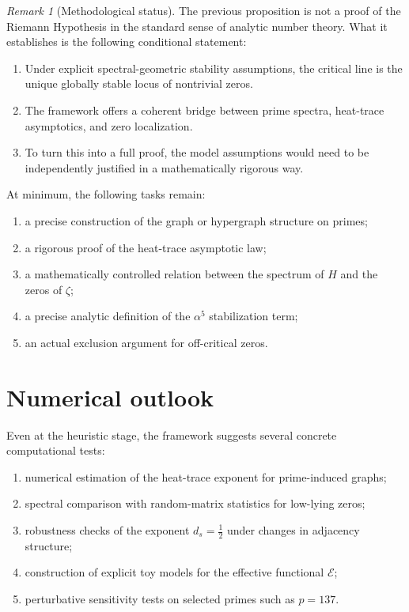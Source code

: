 \documentclass[11pt,a4paper]{amsart}
\theoremstyle{plain}
\theoremstyle{definition}
\theoremstyle{remark}
\newtheorem{remark}[theorem]{Remark}
\newcommand{\zetaR}{\zeta}
\newcommand{\Eeff}{\mathcal{E}}
\begin{document}
	\begin{remark}[Methodological status]
		The previous proposition is not a proof of the Riemann Hypothesis in the standard sense of analytic number theory. What it establishes is the following conditional statement:
		\begin{enumerate}[label=\arabic*.]
			\item Under explicit spectral-geometric stability assumptions, the critical line is the unique globally stable locus of nontrivial zeros.
			\item The framework offers a coherent bridge between prime spectra, heat-trace asymptotics, and zero localization.
			\item To turn this into a full proof, the model assumptions would need to be independently justified in a mathematically rigorous way.
		\end{enumerate}
	\end{remark}
	
	At minimum, the following tasks remain:
	\begin{enumerate}[label=\alph*)]
		\item a precise construction of the graph or hypergraph structure on primes;
		\item a rigorous proof of the heat-trace asymptotic law;
		\item a mathematically controlled relation between the spectrum of \(H\) and the zeros of \(\zetaR\);
		\item a precise analytic definition of the \(\alpha^5\) stabilization term;
		\item an actual exclusion argument for off-critical zeros.
	\end{enumerate}
	
	\section{Numerical outlook}
	
	Even at the heuristic stage, the framework suggests several concrete computational tests:
	\begin{enumerate}[label=\arabic*.]
		\item numerical estimation of the heat-trace exponent for prime-induced graphs;
		\item spectral comparison with random-matrix statistics for low-lying zeros;
		\item robustness checks of the exponent \(d_s=\tfrac12\) under changes in adjacency structure;
		\item construction of explicit toy models for the effective functional \(\Eeff\);
		\item perturbative sensitivity tests on selected primes such as \(p=137\).
	\end{enumerate}
	
\end{document}
